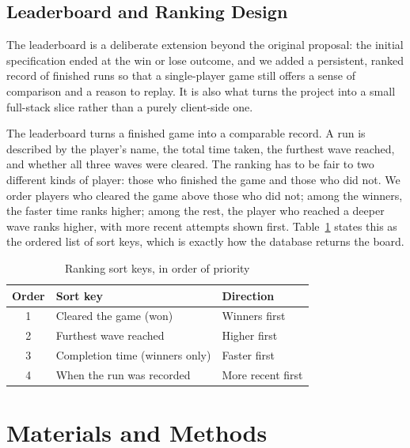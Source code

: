 \documentclass[12pt,a4paper]{report}
\begin{document}
\section{Leaderboard and Ranking Design}

The leaderboard is a deliberate extension beyond the original proposal: the
initial specification ended at the win or lose outcome, and we added a
persistent, ranked record of finished runs so that a single-player game still
offers a sense of comparison and a reason to replay. It is also what turns the
project into a small full-stack slice rather than a purely client-side one.

The leaderboard turns a finished game into a comparable record. A run is
described by the player's name, the total time taken, the furthest wave reached,
and whether all three waves were cleared. The ranking has to be fair to two
different kinds of player: those who finished the game and those who did not. We
order players who cleared the game above those who did not; among the winners,
the faster time ranks higher; among the rest, the player who reached a deeper
wave ranks higher, with more recent attempts shown first. Table~\ref{tab:rank}
states this as the ordered list of sort keys, which is exactly how the database
returns the board.

\begin{table}[h]
\centering
\caption{Ranking sort keys, in order of priority}
\label{tab:rank}
\begin{tabular}{|c|p{6.0cm}|p{3.2cm}|}
\hline
Order & Sort key & Direction \\
\hline
1 & Cleared the game (won) & Winners first \\
\hline
2 & Furthest wave reached & Higher first \\
\hline
3 & Completion time (winners only) & Faster first \\
\hline
4 & When the run was recorded & More recent first \\
\hline
\end{tabular}
\end{table}



\chapter{Materials and Methods}\label{ch:methods}
\end{document}
